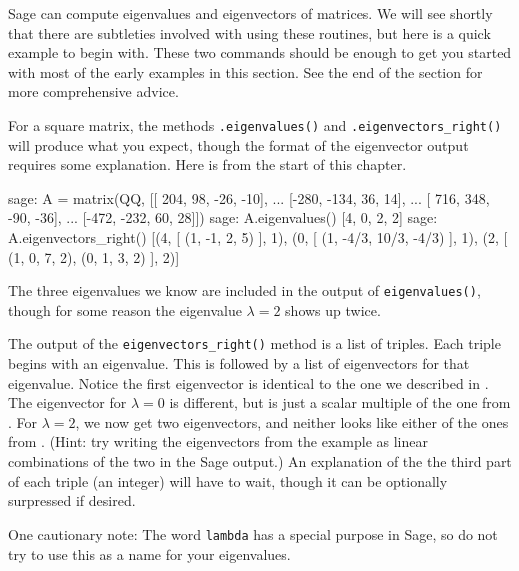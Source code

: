 Sage can compute eigenvalues and eigenvectors of matrices.  We will see shortly that there are subtleties involved with using these routines, but here is a quick example to begin with.  These two commands should be enough to get you started with most of the early examples in this section.  See the end of the section for more comprehensive advice.\par
%
For a square matrix, the methods \verb!.eigenvalues()! and \verb!.eigenvectors_right()! will produce what you expect, though the format of the eigenvector output requires some explanation.  Here is  from the start of this chapter.
%
\begin{sageexample}
sage: A = matrix(QQ, [[ 204,   98, -26, -10],
...                   [-280, -134,  36,  14],
...                   [ 716,  348, -90, -36],
...                   [-472, -232,  60,  28]])
sage: A.eigenvalues()
[4, 0, 2, 2]
sage: A.eigenvectors_right()
[(4, [
(1, -1, 2, 5)
], 1), (0, [
(1, -4/3, 10/3, -4/3)
], 1), (2, [
(1, 0, 7, 2),
(0, 1, 3, 2)
], 2)]
\end{sageexample}
%
The three eigenvalues we know are included in the output of \verb!eigenvalues()!, though for some reason the eigenvalue $\lambda=2$ shows up twice.\par
%
The output of the \verb!eigenvectors_right()! method is a list of triples.  Each triple begins with an eigenvalue.  This is followed by a list of eigenvectors for that eigenvalue.  Notice the first eigenvector is identical to the one we described in .  The eigenvector for $\lambda=0$ is different, but is just a scalar multiple of the one from .  For $\lambda=2$, we now get two eigenvectors, and neither looks like either of the ones from .  (Hint: try writing the eigenvectors from the example as linear combinations of the two in the Sage output.)  An explanation of the the third part of each triple (an integer) will have to wait, though it can be optionally surpressed if desired.\par
%
One cautionary note:  The word \verb!lambda! has a special purpose in Sage, so do not try to use this as a name for your eigenvalues.
%
\begin{sageverbatim}
\end{sageverbatim}
%
